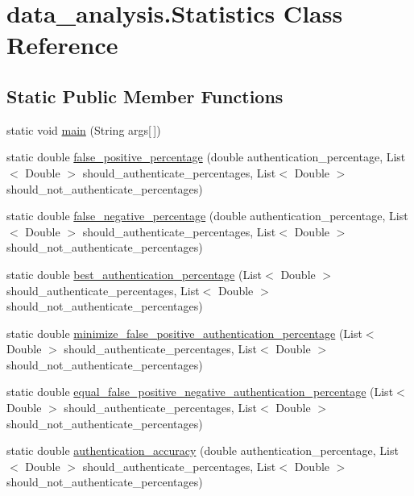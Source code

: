 \hypertarget{classdata__analysis_1_1_statistics}{}\section{data\+\_\+analysis.\+Statistics Class Reference}
\label{classdata__analysis_1_1_statistics}
\subsection*{Static Public Member Functions}
\begin{DoxyCompactItemize}
\item 
static void \hyperlink{classdata__analysis_1_1_statistics_a19371eed8cab72da351f6c35762c83de}{main} (String args\mbox{[}$\,$\mbox{]})
\item 
static double \hyperlink{classdata__analysis_1_1_statistics_a0c7f157e53361c33276290383acff9b6}{false\+\_\+positive\+\_\+percentage} (double authentication\+\_\+percentage, List$<$ Double $>$ should\+\_\+authenticate\+\_\+percentages, List$<$ Double $>$ should\+\_\+not\+\_\+authenticate\+\_\+percentages)
\item 
static double \hyperlink{classdata__analysis_1_1_statistics_abcd420f8186babaf12e030180e4c458d}{false\+\_\+negative\+\_\+percentage} (double authentication\+\_\+percentage, List$<$ Double $>$ should\+\_\+authenticate\+\_\+percentages, List$<$ Double $>$ should\+\_\+not\+\_\+authenticate\+\_\+percentages)
\item 
static double \hyperlink{classdata__analysis_1_1_statistics_afb383973976b2531318be692c4894f5e}{best\+\_\+authentication\+\_\+percentage} (List$<$ Double $>$ should\+\_\+authenticate\+\_\+percentages, List$<$ Double $>$ should\+\_\+not\+\_\+authenticate\+\_\+percentages)
\item 
static double \hyperlink{classdata__analysis_1_1_statistics_a4fff292245c5c2435386e12b129c2b40}{minimize\+\_\+false\+\_\+positive\+\_\+authentication\+\_\+percentage} (List$<$ Double $>$ should\+\_\+authenticate\+\_\+percentages, List$<$ Double $>$ should\+\_\+not\+\_\+authenticate\+\_\+percentages)
\item 
static double \hyperlink{classdata__analysis_1_1_statistics_a7702c206ace91fa095d5b68a24820db2}{equal\+\_\+false\+\_\+positive\+\_\+negative\+\_\+authentication\+\_\+percentage} (List$<$ Double $>$ should\+\_\+authenticate\+\_\+percentages, List$<$ Double $>$ should\+\_\+not\+\_\+authenticate\+\_\+percentages)
\item 
static double \hyperlink{classdata__analysis_1_1_statistics_a8ca0530f61c30cf41f0500e56b6fc11a}{authentication\+\_\+accuracy} (double authentication\+\_\+percentage, List$<$ Double $>$ should\+\_\+authenticate\+\_\+percentages, List$<$ Double $>$ should\+\_\+not\+\_\+authenticate\+\_\+percentages)
\end{DoxyCompactItemize}


